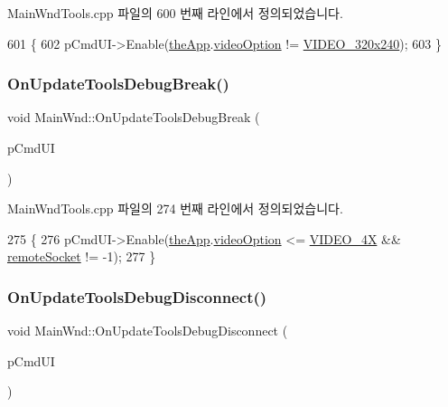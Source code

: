 Main\+Wnd\+Tools.\+cpp 파일의 600 번째 라인에서 정의되었습니다.


\begin{DoxyCode}
601 \{
602   pCmdUI->Enable(\mbox{\hyperlink{_v_b_a_8cpp_a8095a9d06b37a7efe3723f3218ad8fb3}{theApp}}.\mbox{\hyperlink{class_v_b_a_a17dac073149c897f770c00ed7098ad32}{videoOption}} != \mbox{\hyperlink{_v_b_a_8h_a531c35e38ede3ea4e5ba5afb24b29493a658665cfbdbd908bdb77babe125d0341}{VIDEO\_320x240}});
603 \}
\end{DoxyCode}
\mbox{\label{class_main_wnd_ae3d32c8d517114261df5adc88ff0f2c9}} 
\subsubsection{\texorpdfstring{On\+Update\+Tools\+Debug\+Break()}{OnUpdateToolsDebugBreak()}}
{\footnotesize\ttfamily void Main\+Wnd\+::\+On\+Update\+Tools\+Debug\+Break (\begin{DoxyParamCaption}\item[{C\+Cmd\+UI $\ast$}]{p\+Cmd\+UI }\end{DoxyParamCaption})\hspace{0.3cm}{\ttfamily [protected]}}



Main\+Wnd\+Tools.\+cpp 파일의 274 번째 라인에서 정의되었습니다.


\begin{DoxyCode}
275 \{
276   pCmdUI->Enable(\mbox{\hyperlink{_v_b_a_8cpp_a8095a9d06b37a7efe3723f3218ad8fb3}{theApp}}.\mbox{\hyperlink{class_v_b_a_a17dac073149c897f770c00ed7098ad32}{videoOption}} <= \mbox{\hyperlink{_v_b_a_8h_a531c35e38ede3ea4e5ba5afb24b29493a6468bce6b84e6350d3de126f257eb38d}{VIDEO\_4X}} && 
      \mbox{\hyperlink{_main_wnd_tools_8cpp_a4fdb1b96f709fc5cdd1d013c1703e484}{remoteSocket}} != -1);
277 \}
\end{DoxyCode}
\mbox{\label{class_main_wnd_a41dd5d381b27cae7a9f7d1d685d1ab09}} 
\subsubsection{\texorpdfstring{On\+Update\+Tools\+Debug\+Disconnect()}{OnUpdateToolsDebugDisconnect()}}
{\footnotesize\ttfamily void Main\+Wnd\+::\+On\+Update\+Tools\+Debug\+Disconnect (\begin{DoxyParamCaption}\item[{C\+Cmd\+UI $\ast$}]{p\+Cmd\+UI }\end{DoxyParamCaption})\hspace{0.3cm}{\ttfamily [protected]}}



